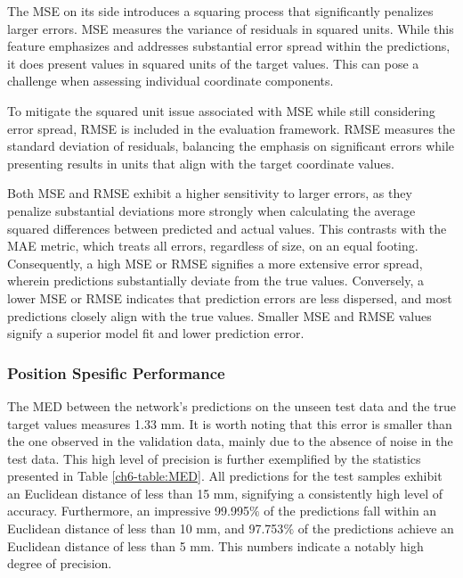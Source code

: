 \documentclass[a4paper, UKenglish, 11pt]{uiomaster}
\begin{document}
The MSE on its side introduces a squaring process that significantly penalizes larger errors. MSE measures the variance of residuals in squared units. While this feature emphasizes and addresses substantial error spread within the predictions, it does present values in squared units of the target values. This can pose a challenge when assessing individual coordinate components.

To mitigate the squared unit issue associated with MSE while still considering error spread, RMSE is included in the evaluation framework. RMSE measures the standard deviation of residuals, balancing the emphasis on significant errors while presenting results in units that align with the target coordinate values.

Both MSE and RMSE exhibit a higher sensitivity to larger errors, as they penalize substantial deviations more strongly when calculating the average squared differences between predicted and actual values. This contrasts with the MAE metric, which treats all errors, regardless of size, on an equal footing. Consequently, a high MSE or RMSE signifies a more extensive error spread, wherein predictions substantially deviate from the true values. Conversely, a lower MSE or RMSE indicates that prediction errors are less dispersed, and most predictions closely align with the true values. Smaller MSE and RMSE values signify a superior model fit and lower prediction error.


\subsubsection{Position Spesific Performance}
The MED between the network's predictions on the unseen test data and the true target values measures 1.33 mm. It is worth noting that this error is smaller than the one observed in the validation data, mainly due to the absence of noise in the test data. This high level of precision is further exemplified by the statistics presented in Table \ref{ch6-table:MED}. All predictions for the test samples exhibit an Euclidean distance of less than 15 mm, signifying a consistently high level of accuracy. Furthermore, an impressive 99.995$\%$ of the predictions fall within an Euclidean distance of less than 10 mm, and 97.753$\%$ of the predictions achieve an Euclidean distance of less than 5 mm. This numbers indicate a notably high degree of precision.
\end{document}
